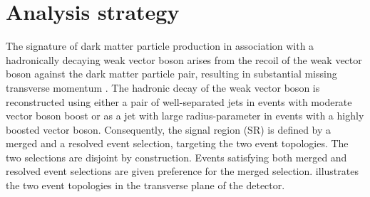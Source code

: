 \section{Analysis strategy}
\label{sec:monoV:analysis}
The signature of dark matter particle production in association with a hadronically decaying weak vector boson arises from the recoil of the weak vector boson against the dark matter particle pair, resulting in substantial missing transverse momentum \met. The hadronic decay of the weak vector boson is reconstructed using either a pair of well-separated jets in events with moderate vector boson boost or as a jet with large radius-parameter in events with a highly boosted vector boson.
Consequently, the signal region (SR) is defined by a merged and a resolved event selection, targeting the two event topologies. The two selections are disjoint by construction. Events satisfying both merged and resolved event selections are given preference for the merged selection.
 illustrates the two event topologies in the transverse plane of the detector.

